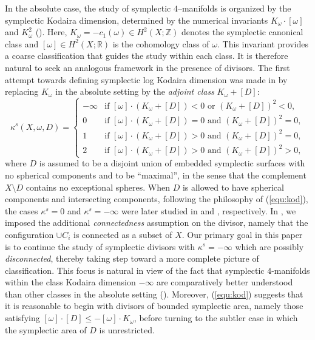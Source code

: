 \documentclass[11pt]{article}
\theoremstyle{definition}
\theoremstyle{remark}
\begin{document}
In the absolute case, the study of symplectic $4$--manifolds is organized by the symplectic Kodaira dimension, determined by the numerical invariants $K_\omega\cdot[\omega]$ and $K_\omega^2$ (\cite{MSsurvey,Likod1,Likod2}). Here, $K_\omega=-c_1(\omega)\in H^2(X;\mathbb{Z})$ denotes the symplectic canonical class and $[\omega]\in H^2(X;\mathbb{R})$ is the cohomology class of $\omega$. This invariant provides a coarse classification that guides the study within each class. It is therefore natural to seek an analogous framework in the presence of divisors. The first attempt towards defining symplectic log Kodaira dimension was made in \cite{Lizhanglogkod} by replacing $K_\omega$ in the absolute setting by the \emph{adjoint class} $K_\omega+[D]$:
\begin{equation}\label{equ:kod}\tag{\textdagger}
\kappa^s(X,\omega,D) = 
\begin{cases}
   -\infty & \text{if }[\omega]\cdot (K_\omega+[D])<0\text{ or }(K_\omega+[D])^2<0,\\
   0 & \text{if }[\omega]\cdot (K_\omega+[D])=0\text{ and }(K_\omega+[D])^2=0,\\
   1 & \text{if }[\omega]\cdot (K_\omega+[D])>0\text{ and }(K_\omega+[D])^2=0,\\
   2 & \text{if }[\omega]\cdot (K_\omega+[D])>0\text{ and }(K_\omega+[D])^2>0,
\end{cases}
\end{equation}
where $D$ is assumed to be a disjoint union of embedded symplectic surfaces with no spherical components and to be ``maximal'', in the sense that the complement $X\setminus D$ contains no exceptional spheres. When $D$ is allowed to have spherical components and intersecting components, following the philosophy of (\ref{equ:kod}), the cases $\kappa^s=0$ and $\kappa^s=-\infty$ were later studied in \cite{Limak,LMN22} and \cite{LN25}, respectively. In \cite{LN25}, we imposed the additional \emph{connectedness} assumption on the divisor, namely that the configuration $\cup C_i$ is connected as a subset of $X$. Our primary goal in this paper is to continue the study of symplectic divisors with $\kappa^s=-\infty$ which are possibly \emph{disconnected}, thereby taking step toward a more complete picture of classification. This focus is natural in view of the fact that symplectic $4$-manifolds within the class Kodaira dimension $-\infty$ are comparatively better understood than other classes in the absolute setting (\cite[Section 4.1]{Likod2}). Moreover, (\ref{equ:kod}) suggests that it is reasonable to begin with divisors of bounded symplectic area, namely those satisfying $[\omega]\cdot [D]\leq -[\omega]\cdot K_\omega$, before turning to the subtler case in which the symplectic area of $D$ is unrestricted.
\end{document}
